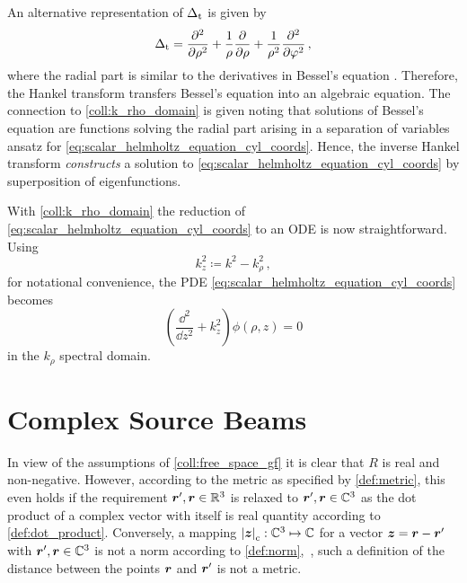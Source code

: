 \begin{remark}
	An alternative representation of $\operatorname{\operatorname{\Delta}_\mathrm{t}}$ is given by
	\cite[(1.5.15)]{Olver2010}
	\begin{equation}
		\operatorname{\operatorname{\Delta}_\mathrm{t}} =
		\frac{\partial^2}{\partial \rho^2} + 
		\frac{1}{\rho}
		\frac{\partial}{\partial \rho} + 
		\frac{1}{\rho^2}
		\frac{\partial^2}{\partial \varphi^2}
		\, ,
	\end{equation}
	where the radial part is similar to the derivatives in Bessel's equation
	\cite[(10.2.1)]{Olver2010}.
	Therefore, the Hankel transform transfers Bessel's equation into an
	algebraic equation.
	The connection to \cref{coll:k_rho_domain} is given noting that 
	solutions of Bessel's equation are functions solving the radial part arising
	in a separation of variables ansatz for
	\eqref{eq:scalar_helmholtz_equation_cyl_coords}.
	Hence, the inverse Hankel transform \emph{constructs} a solution to
	\eqref{eq:scalar_helmholtz_equation_cyl_coords} by superposition of
	eigenfunctions.
\end{remark}

With \cref{coll:k_rho_domain} the reduction of
\eqref{eq:scalar_helmholtz_equation_cyl_coords} to an \ac{ODE} is now
straightforward.
Using
\begin{equation}
	k_z^2 \coloneqq k^2 - k_\rho^2
	\, ,
\end{equation}
for notational convenience, the \ac{PDE}
\eqref{eq:scalar_helmholtz_equation_cyl_coords} becomes
\begin{equation}
	\left( \frac{\dd^2}{\dd z^2} + k_z^2 \right)
	\phi \left(\rho, z\right) = 0
\end{equation}
in the $k_\rho$ spectral domain.







\section{Complex Source Beams}
\label{sec:cmplx_src_beams}

In view of the assumptions of \cref{coll:free_space_gf} it is clear that
$R$ is real and non-negative.
However, according to the metric as specified by \cref{def:metric}, this even
holds if the requirement $\rsrc, \robs \in \R^3$ is relaxed to
$\rsrc, \robs \in \C^3$ as the dot product of a complex vector with itself
is real quantity according to \cref{def:dot_product}.
Conversely, a mapping $\cmplxlength{\pvec{z}}: \C^3 \mapsto \C$ for a vector
$\pvec{z} = \rdiff$ with $\rsrc, \robs \in \C^3$ is not a norm according
to \cref{def:norm},~\ie, such a definition of the distance between the
points $\robs$ and $\rsrc$ is not a metric.

